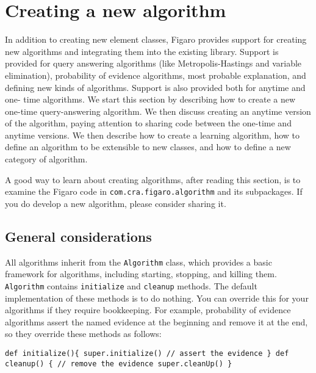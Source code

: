 
\chapter{Creating a new algorithm} %

\label{Creating a new algorithm} %

In addition to creating new element classes, Figaro provides support for creating new algorithms and integrating them into the existing library. Support is provided for query answering algorithms (like Metropolis-Hastings and variable elimination), probability of evidence algorithms, most probable explanation, and defining new kinds of algorithms. Support is also provided both for anytime and one- time algorithms. We start this section by describing how to create a new one-time query-answering algorithm. We then discuss creating an anytime version of the algorithm, paying attention to sharing code between the one-time and anytime versions. We then describe how to create a learning algorithm, how to define an algorithm to be extensible to new classes, and how to define a new category of algorithm.

A good way to learn about creating algorithms, after reading this section, is to examine the Figaro code in \texttt{com.cra.figaro.algorithm} and its subpackages. If you do develop a new algorithm, please consider sharing it.

\section{General considerations}

All algorithms inherit from the \texttt{Algorithm} class, which provides a basic framework for algorithms, including starting, stopping, and killing them. \texttt{Algorithm} contains \texttt{initialize} and \texttt{cleanup} methods. The default implementation of these methods is to do nothing. You can override this for your algorithms if they require bookkeeping. For example, probability of evidence algorithms assert the named evidence at the beginning and remove it at the end, so they override these methods as follows:

\begin{flushleft}
\texttt{def initialize()\{
\newline super.initialize()
\newline // assert the evidence
\newline \}
\newline 
\newline def cleanup() \{
\newline // remove the evidence
\newline super.cleanUp()
\newline \}
}
\end{flushleft}

